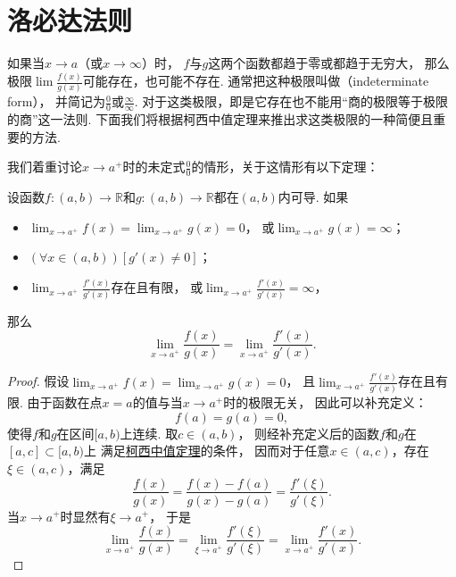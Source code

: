 \section{洛必达法则}
如果当\(x \to a\)（或\(x \to \infty\)）时，
\(f\)与\(g\)这两个函数都趋于零或都趋于无穷大，
那么极限\(\lim\frac{f(x)}{g(x)}\)可能存在，也可能不存在.
通常把这种极限叫做（indeterminate form），
并简记为\(\frac{0}{0}\)或\(\frac{\infty}{\infty}\).
对于这类极限，即是它存在也不能用“商的极限等于极限的商”这一法则.
下面我们将根据柯西中值定理来推出求这类极限的一种简便且重要的方法.

我们着重讨论\(x \to a^+\)时的未定式\(\frac{0}{0}\)的情形，关于这情形有以下定理：
\begin{theorem}\label{theorem:微分中值定理.洛必达法则1}
设函数\(f\colon(a,b)\to\mathbb{R}\)和\(g\colon(a,b)\to\mathbb{R}\)都在\((a,b)\)内可导.
如果\begin{itemize}
	\item \(\lim_{x \to a^+} f(x) = \lim_{x \to a^+} g(x) = 0\)，
	或\(\lim_{x \to a^+} g(x) = \infty\)；
	\item \((\forall x \in (a,b))[g'(x) \neq 0]\)；
	\item \(\lim_{x \to a^+} \frac{f'(x)}{g'(x)}\)存在且有限，
	或\(\lim_{x \to a^+} \frac{f'(x)}{g'(x)} = \infty\)，
\end{itemize}
那么\[
	\lim_{x \to a^+} \frac{f(x)}{g(x)}
	= \lim_{x \to a^+} \frac{f'(x)}{g'(x)}.
\]
\begin{proof}
假设\(\lim_{x \to a^+} f(x) = \lim_{x \to a^+} g(x) = 0\)，
且\(\lim_{x \to a^+} \frac{f'(x)}{g'(x)}\)存在且有限.
由于函数在点\(x=a\)的值与当\(x \to a^+\)时的极限无关，
因此可以补充定义：\[
	f(a) = g(a) = 0,
\]
使得\(f\)和\(g\)在区间\([a,b)\)上连续.
取\(c\in(a,b)\)，
则经补充定义后的函数\(f\)和\(g\)在\([a,c]\subset[a,b)\)上
满足\hyperref[theorem:微分中值定理.柯西中值定理]{柯西中值定理}的条件，
因而对于任意\(x\in(a,c)\)，存在\(\xi\in(a,c)\)，满足\[
	\frac{f(x)}{g(x)}
	= \frac{f(x)-f(a)}{g(x)-g(a)}
	= \frac{f'(\xi)}{g'(\xi)}.
\]
当\(x \to a^+\)时显然有\(\xi \to a^+\)，
于是\[
	\lim_{x \to a^+} \frac{f(x)}{g(x)}
	= \lim_{\xi \to a^+} \frac{f'(\xi)}{g'(\xi)}
	= \lim_{x \to a^+} \frac{f'(x)}{g'(x)}.
\]


\end{proof}
\end{theorem}
